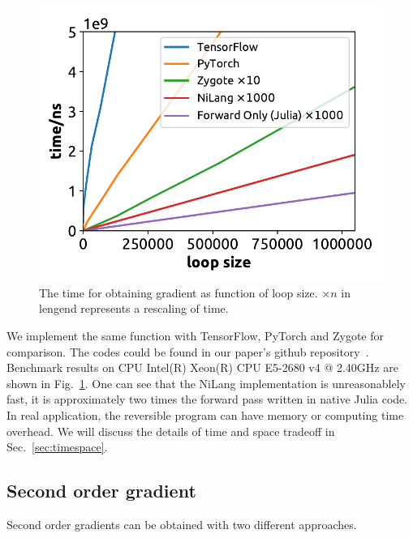 \documentclass[aps,twocolumn,longbibliography,english,superscriptaddress,prr]{revtex4-1}
\newcommand{\<}{\langle}
\renewcommand{\>}{\rangle}
\newcommand{\Fig}[1]{Fig.~\ref{#1}}
\newcommand{\Sec}[1]{Sec.~\ref{#1}}
\theoremstyle{definition}\newtheorem{definition}{\textit{Definition}}
\begin{document}
\begin{figure}
    \centerline{\includegraphics[width=0.9\columnwidth,trim={0 0cm 0 0},clip]{images/fig3.pdf}}
    \caption{The time for obtaining gradient as function of loop size. $\times n$ in lengend represents a rescaling of time.}\label{fig:benchmark}
\end{figure}
We implement the same function with TensorFlow, PyTorch and Zygote for comparison. The codes could be found in our paper's github repository~\cite{benchmark}. Benchmark results on CPU Intel(R) Xeon(R) CPU E5-2680 v4 @ 2.40GHz are shown in \Fig{fig:benchmark}.
One can see that the NiLang implementation is unreasonablely fast, it is approximately two times the forward pass written in native Julia code.
In real application, the reversible program can have memory or computing time overhead. We will discuss the details of time and space tradeoff in \Sec{sec:timespace}.

\subsection{Second order gradient}
Second order gradients can be obtained with two different approaches.
\end{document}
